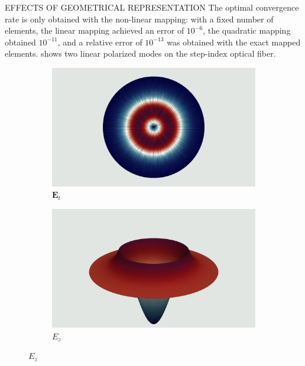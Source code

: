 \documentclass[debug]{beamer} %
\begin{document}
\begin{frame}
\begin{minipage}[t]{0.45\textwidth}
\begin{block}{\boxnumber EFFECTS OF GEOMETRICAL REPRESENTATION}
	        The optimal convergence rate is only obtained with the non-linear mapping: with a fixed number of elements, the linear mapping achieved an error of $10^{-6}$, the quadratic mapping obtained $10^{-11}$, and a relative error of $10^{-13}$ was obtained with the exact mapped elements.  shows two linear polarized modes on the step-index optical fiber.
	        \begin{figure}[hb]
	        	\begin{mdframed}[backgroundcolor=bggrey]
					\centering
					\begin{subfigure}[b]{.4999\textwidth}
						\centering
						\caption*{$\displaystyle\bm{E}_t$}
						\includegraphics[width=1\linewidth]{images/et2posterStepFiber.png}%
					\end{subfigure}\hfill
					\begin{subfigure}[b]{.4999\textwidth}
						\centering
						\caption*{$\displaystyle E_z$}
						\includegraphics[width=1\linewidth]{images/ez2posterStepFiber.png}%
					\end{subfigure}


\end{mdframed}
\end{figure}
\end{block}
\end{minipage}
\end{frame}
\end{document}
